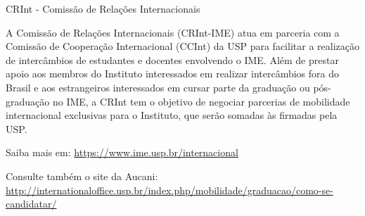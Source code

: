 \begin{secao}{CRInt - Comissão de Relações Internacionais}

A Comissão de Relações Internacionais (CRInt-IME) atua em parceria com a Comissão
de Cooperação Internacional (CCInt) da USP para facilitar a realização de
intercâmbios de estudantes e docentes envolvendo o IME. Além de prestar apoio aos
membros do Instituto interessados em realizar intercâmbios fora do Brasil e aos
estrangeiros interessados em cursar parte da graduação ou pós-graduação no IME,
a CRInt tem o objetivo de negociar parcerias de mobilidade internacional exclusivas
para o Instituto, que serão somadas às firmadas pela USP.

Saiba mais em: \url{https://www.ime.usp.br/internacional}

Consulte também o site da Aucani: \url{http://internationaloffice.usp.br/index.php/mobilidade/graduacao/como-se-candidatar/}

\end{secao}
